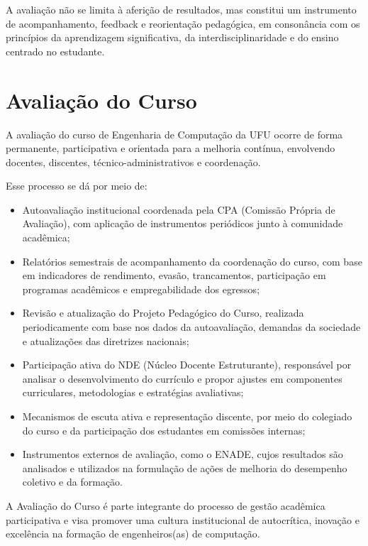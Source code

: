 A avaliação não se limita à aferição de resultados, mas constitui um instrumento de acompanhamento, feedback e reorientação pedagógica, em consonância com os princípios da aprendizagem significativa, da interdisciplinaridade e do ensino centrado no estudante.

\section{Avaliação do Curso}

A avaliação do curso de Engenharia de Computação da UFU ocorre de forma permanente, participativa e orientada para a melhoria contínua, envolvendo docentes, discentes, técnico-administrativos e coordenação.

Esse processo se dá por meio de:

\begin{itemize}
    \item Autoavaliação institucional coordenada pela CPA (Comissão Própria de Avaliação), com aplicação de instrumentos periódicos junto à comunidade acadêmica;
    \item Relatórios semestrais de acompanhamento da coordenação do curso, com base em indicadores de rendimento, evasão, trancamentos, participação em programas acadêmicos e empregabilidade dos egressos;
    \item Revisão e atualização do Projeto Pedagógico do Curso, realizada periodicamente com base nos dados da autoavaliação, demandas da sociedade e atualizações das diretrizes nacionais;
    \item Participação ativa do NDE (Núcleo Docente Estruturante), responsável por analisar o desenvolvimento do currículo e propor ajustes em componentes curriculares, metodologias e estratégias avaliativas;
    \item Mecanismos de escuta ativa e representação discente, por meio do colegiado do curso e da participação dos estudantes em comissões internas;
    \item Instrumentos externos de avaliação, como o ENADE, cujos resultados são analisados e utilizados na formulação de ações de melhoria do desempenho coletivo e da formação.
\end{itemize}
    
A Avaliação do Curso é parte integrante do processo de gestão acadêmica participativa e visa promover uma cultura institucional de autocrítica, inovação e excelência na formação de engenheiros(as) de computação.